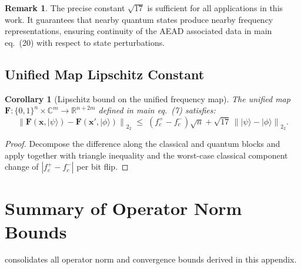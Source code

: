 \documentclass[12pt,letterpaper]{article}
\theoremstyle{plain}
\newtheorem{corollary}[theorem]{Corollary}
\theoremstyle{definition}
\newtheorem{remark}[theorem]{Remark}
\newcommand{\vecnorm}[1]{\left\|#1\right\|_{2}}
\newcommand{\R}{\mathbb{R}}
\newcommand{\C}{\mathbb{C}}
\begin{document}
\begin{remark}
The precise constant \(\sqrt{17}\) is sufficient for all
applications in this work.  It guarantees that nearby quantum states
produce nearby frequency representations, ensuring continuity of the
AEAD associated data in main eq.~(20) with respect to state perturbations.
\end{remark}

\subsection{Unified Map Lipschitz Constant}

\begin{corollary}[Lipschitz bound on the unified frequency map]
\label{cor:F_lipschitz}
The unified map
\(\mathbf{F}: \{0,1\}^n \times \C^m \to \R^{n+2m}\)
defined in main eq.~(7) satisfies:
\[
  \vecnorm{\mathbf{F}(\mathbf{x},|\psi\rangle)
         - \mathbf{F}(\mathbf{x}',|\phi\rangle)}_2
  \;\leq\;
  (f_c^+ - f_c^-)\sqrt{n}
  + \sqrt{17}\,\vecnorm{|\psi\rangle - |\phi\rangle}_2.
\]
\end{corollary}
\begin{proof}
Decompose the difference along the classical and quantum blocks and
apply  together with
triangle inequality and the worst-case classical component change
of \(|f_c^+ - f_c^-|\) per bit flip.
\end{proof}

\section{Summary of Operator Norm Bounds}
\label{app:summary}

 consolidates all operator norm and convergence
bounds derived in this appendix.
\end{document}
